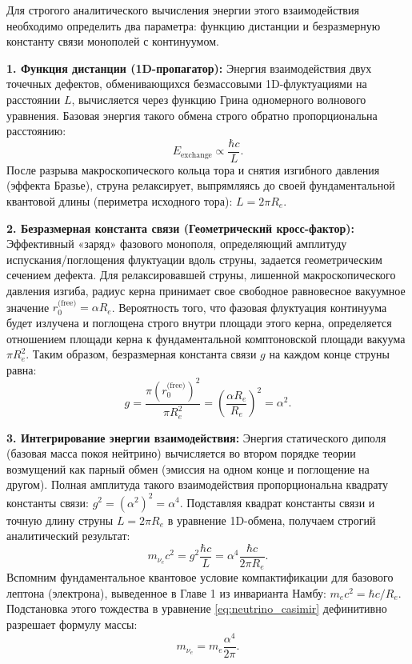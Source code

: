 \documentclass[11pt,a4paper]{article}
\begin{document}
	Для строгого аналитического вычисления энергии этого взаимодействия необходимо определить два параметра: функцию дистанции и безразмерную константу связи монополей с континуумом.
	
	\textbf{1. Функция дистанции (1D-пропагатор):}
	Энергия взаимодействия двух точечных дефектов, обменивающихся безмассовыми 1D-флуктуациями на расстоянии $L$, вычисляется через функцию Грина одномерного волнового уравнения. Базовая энергия такого обмена строго обратно пропорциональна расстоянию:
	\begin{equation}
		E_{\text{exchange}} \propto \frac{\hbar c}{L}.
	\end{equation}
	После разрыва макроскопического кольца тора и снятия изгибного давления (эффекта Бразье), струна релаксирует, выпрямляясь до своей фундаментальной квантовой длины (периметра исходного тора): $L = 2\pi R_e$.
	
	\textbf{2. Безразмерная константа связи (Геометрический кросс-фактор):}
	Эффективный «заряд» фазового монополя, определяющий амплитуду испускания/поглощения флуктуации вдоль струны, задается геометрическим сечением дефекта. 
	Для релаксировавшей струны, лишенной макроскопического давления изгиба, радиус керна принимает свое свободное равновесное вакуумное значение $r_0^{\text{(free)}} = \alpha R_e$. 
	Вероятность того, что фазовая флуктуация континуума будет излучена и поглощена строго внутри площади этого керна, определяется отношением площади керна к фундаментальной комптоновской площади вакуума $\pi R_e^2$. Таким образом, безразмерная константа связи $g$ на каждом конце струны равна:
	\begin{equation}
		g = \frac{\pi (r_0^{\text{(free)}})^2}{\pi R_e^2} = \left( \frac{\alpha R_e}{R_e} \right)^2 = \alpha^2.
	\end{equation}
	
	\textbf{3. Интегрирование энергии взаимодействия:}
	Энергия статического диполя (базовая масса покоя нейтрино) вычисляется во втором порядке теории возмущений как парный обмен (эмиссия на одном конце и поглощение на другом). Полная амплитуда такого взаимодействия пропорциональна квадрату константы связи: $g^2 = (\alpha^2)^2 = \alpha^4$.
	Подставляя квадрат константы связи и точную длину струны $L = 2\pi R_e$ в уравнение 1D-обмена, получаем строгий аналитический результат:
	\begin{equation}
		m_{\nu_e} c^2 = g^2 \frac{\hbar c}{L} = \alpha^4 \frac{\hbar c}{2\pi R_e}.
		\label{eq:neutrino_casimir}
	\end{equation}
	Вспомним фундаментальное квантовое условие компактификации для базового лептона (электрона), выведенное в Главе 1 из инварианта Намбу: $m_e c^2 = \hbar c / R_e$. Подстановка этого тождества в уравнение \eqref{eq:neutrino_casimir} дефинитивно разрешает формулу массы:
	\begin{equation}
		m_{\nu_e} = m_e \frac{\alpha^4}{2\pi}.
	\end{equation}
	
\end{document}
